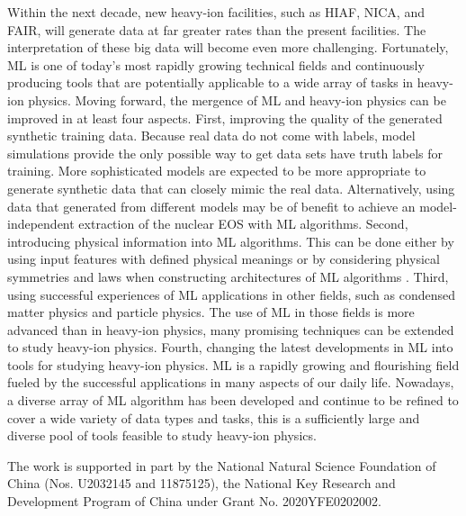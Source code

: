 \documentclass[twocolumn,aps,superscriptaddress]{revtex4}
\begin{document}
Within the next decade, new heavy-ion facilities, such as HIAF, NICA, and FAIR, will generate data at far greater rates than the present facilities. The interpretation of these big data will become even more challenging.
Fortunately, ML is one of today's most rapidly growing technical fields and continuously producing tools
that are potentially applicable to a wide array of tasks in heavy-ion physics. Moving forward, the mergence of ML and heavy-ion physics can be improved in at least four aspects. First, improving the quality of the generated synthetic training data. Because real data do not come with labels, model simulations provide the only possible way to get data sets have truth labels for training. More sophisticated models are expected to be more appropriate to generate synthetic data that can closely mimic the real data.  Alternatively, using data that generated from different models may be of benefit to achieve an model-independent extraction of the nuclear EOS with ML algorithms. Second, introducing physical information into ML algorithms. This can be done either by using input features with defined physical meanings or by considering physical symmetries and laws when constructing architectures of ML algorithms \cite{raissi2019physics}. Third, using successful experiences of ML applications in other fields, such as condensed matter physics and particle physics. The use of ML in those fields  is more advanced than in heavy-ion physics, many promising techniques can be extended to study heavy-ion physics. Fourth, changing the latest developments in ML into tools for studying heavy-ion physics. ML is a rapidly growing and flourishing field fueled by the successful applications in many aspects of our daily life. Nowadays, a diverse array of ML algorithm has been developed and continue to be refined to cover a wide variety of data types and tasks, this is a sufficiently large and diverse pool of tools feasible to study heavy-ion physics.

%
The work is supported in part by the National Natural Science Foundation of China (Nos. U2032145 and 11875125), the National Key Research and Development Program of China under Grant No. 2020YFE0202002.



\end{document}
